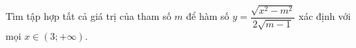 \begin{ex}
Tìm tập hợp tất cả giá trị của tham số $m$ để hàm số $y=\dfrac{\sqrt{x^2-m^2}}{2\sqrt{m-1}}$ xác định với mọi $x\in(3;+\infty)$.
\end{ex}
